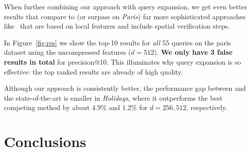 \documentclass[runningheads]{llncs}
\begin{document}
When further combining our approach with query expansion, we get even better results that compare to (or surpass on \emph{Paris}) far more sophisticated approaches like~\cite{MPCM10,CMPM11,ToJA15} that are based on local features and include spatial verification steps.

In Figure~\ref{fig:res} we show the top-10 results for \textit{all} 55 queries on the paris dataset using the uncompressed \Crow features ($d=512$). \textbf{We only have 3 false results in total} for precision@10. This illuminates why query expansion is so effective: the top ranked results are already of high quality.

Although our approach is consistently better, the performance gap between \Crow and the state-of-the-art is smaller in \emph{Holidays}, where it outperforms the best competing method by about $4.9\%$ and $1.2\%$ for $d=256,512$, respectively.

































































 



 \section{Conclusions}
\label{sec:conclusions}
\end{document}
